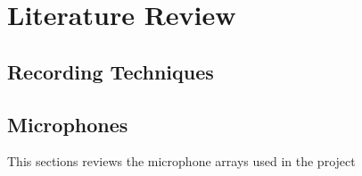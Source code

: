 
















\section{Literature Review} \label{lit}

	\subsection{Recording Techniques}

	\subsection{Microphones} \label{lit:microphones}
	
		This sections reviews the microphone arrays used in the project